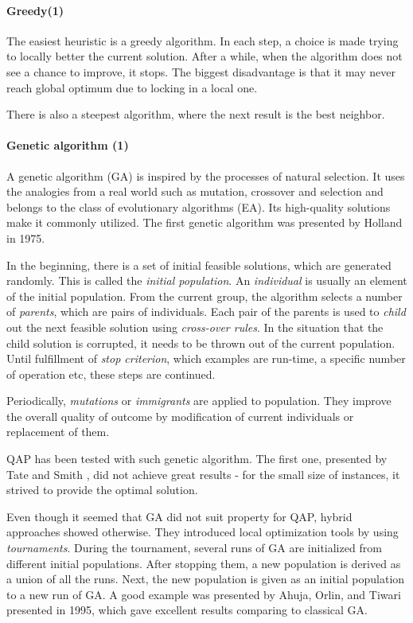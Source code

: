 \paragraph{Greedy(1)}

The easiest heuristic is a greedy algorithm.
In each step, a choice is made trying to locally better the current solution.
After a while, when the algorithm does not see a chance to improve, it stops.
The biggest disadvantage is that it may never reach global optimum due to locking in a local one.

There is also a steepest algorithm, where the next result is the best neighbor.


\paragraph{Genetic algorithm (1)}

A genetic algorithm (GA) is inspired by the processes of natural selection.
It uses the analogies from a real world such as mutation, crossover and selection and belongs to the class of evolutionary algorithms (EA).
Its high-quality solutions make it commonly utilized.
The first genetic algorithm was presented by Holland \cite{holland1975adaptation} in 1975.

In the beginning, there is a set of initial feasible solutions, which are generated randomly.
This is called the \textit{initial population}.
An \textit{individual} is usually an element of the initial population.
From the current group, the algorithm selects a number of \textit{parents}, which are pairs of individuals.
Each pair of the parents is used to \textit{child} out the next feasible solution using \textit{cross-over rules}.
In the situation that the child solution is corrupted, it needs to be thrown out of the current population.
Until fulfillment of \textit{stop criterion}, which examples are run-time, a specific number of operation etc, these steps are continued.

Periodically, \textit{mutations} or \textit{immigrants} are applied to population.
They improve the overall quality of outcome by modification of current individuals or replacement of them.

QAP has been tested with such genetic algorithm.
The first one, presented by Tate and Smith \cite{tate1995genetic}, did not achieve great results - for the small size of instances, it strived to provide the optimal solution.

Even though it seemed that GA did not suit property for QAP, hybrid approaches showed otherwise.
They introduced local optimization tools by using \textit{tournaments}.
During the tournament, several runs of GA are initialized from different initial populations.
After stopping them, a new population is derived as a union of all the runs.
Next, the new population is given as an initial population to a new run of GA.
A good example was presented by Ahuja, Orlin, and Tiwari \cite{ahuja2000greedy} presented in 1995, which gave excellent results comparing to classical GA.

